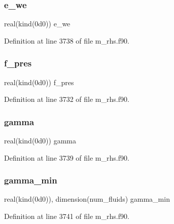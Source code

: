 \subsubsection{\texorpdfstring{e\+\_\+we}{e\_we}}
{\footnotesize\ttfamily real(kind(0d0)) e\+\_\+we}



Definition at line 3738 of file m\+\_\+rhs.\+f90.

\mbox{\label{m__rhs_8f90_a250b49b4cd6e8ad9bcd9e2a7b46c39dc}} 
\subsubsection{\texorpdfstring{f\+\_\+pres}{f\_pres}}
{\footnotesize\ttfamily real(kind(0d0)) f\+\_\+pres}



Definition at line 3732 of file m\+\_\+rhs.\+f90.

\mbox{\label{m__rhs_8f90_a298183e270a405e0f180d45940bb6f8a}} 
\subsubsection{\texorpdfstring{gamma}{gamma}}
{\footnotesize\ttfamily real(kind(0d0)) gamma}



Definition at line 3739 of file m\+\_\+rhs.\+f90.

\mbox{\label{m__rhs_8f90_aba715ebddc63d396377dc69d35cb50f8}} 
\subsubsection{\texorpdfstring{gamma\+\_\+min}{gamma\_min}}
{\footnotesize\ttfamily real(kind(0d0)), dimension(num\+\_\+fluids) gamma\+\_\+min}



Definition at line 3741 of file m\+\_\+rhs.\+f90.

\mbox{\label{m__rhs_8f90_aaea4baed8fd8b780f6938f0dc1fb0f72}} 
